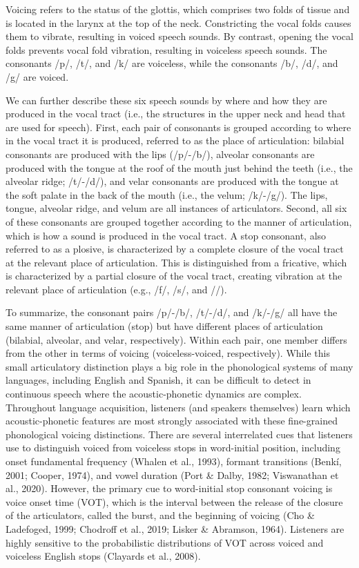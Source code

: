 \documentclass[
  12pt,
  twoside]{article}
\begin{document}
Voicing refers to the status of the glottis, which comprises two folds of tissue and is located in the larynx at the top of the neck.
Constricting the vocal folds causes them to vibrate, resulting in voiced speech sounds.
By contrast, opening the vocal folds prevents vocal fold vibration, resulting in voiceless speech sounds.
The consonants /p/, /t/, and /k/ are voiceless, while the consonants /b/, /d/, and /g/ are voiced.

We can further describe these six speech sounds by where and how they are produced in the vocal tract (i.e., the structures in the upper neck and head that are used for speech).
First, each pair of consonants is grouped according to where in the vocal tract it is produced, referred to as the place of articulation: bilabial consonants are produced with the lips (/p/-/b/), alveolar consonants are produced with the tongue at the roof of the mouth just behind the teeth (i.e., the alveolar ridge; /t/-/d/), and velar consonants are produced with the tongue at the soft palate in the back of the mouth (i.e., the velum; /k/-/g/).
The lips, tongue, alveolar ridge, and velum are all instances of articulators.
Second, all six of these consonants are grouped together according to the manner of articulation, which is how a sound is produced in the vocal tract.
A stop consonant, also referred to as a plosive, is characterized by a complete closure of the vocal tract at the relevant place of articulation.
This is distinguished from a fricative, which is characterized by a partial closure of the vocal tract, creating vibration at the relevant place of articulation (e.g., /f/, /s/, and //).

To summarize, the consonant pairs /p/-/b/, /t/-/d/, and /k/-/g/ all have the same manner of articulation (stop) but have different places of articulation (bilabial, alveolar, and velar, respectively).
Within each pair, one member differs from the other in terms of voicing (voiceless-voiced, respectively).
While this small articulatory distinction plays a big role in the phonological systems of many languages, including English and Spanish, it can be difficult to detect in continuous speech where the acoustic-phonetic dynamics are complex.
Throughout language acquisition, listeners (and speakers themselves) learn which acoustic-phonetic features are most strongly associated with these fine-grained phonological voicing distinctions.
There are several interrelated cues that listeners use to distinguish voiced from voiceless stops in word-initial position, including onset fundamental frequency (Whalen et al., 1993), formant transitions (Benkí, 2001; Cooper, 1974), and vowel duration (Port \& Dalby, 1982; Viswanathan et al., 2020).
However, the primary cue to word-initial stop consonant voicing is voice onset time (VOT), which is the interval between the release of the closure of the articulators, called the burst, and the beginning of voicing (Cho \& Ladefoged, 1999; Chodroff et al., 2019; Lisker \& Abramson, 1964).
Listeners are highly sensitive to the probabilistic distributions of VOT across voiced and voiceless English stops (Clayards et al., 2008).
\end{document}
